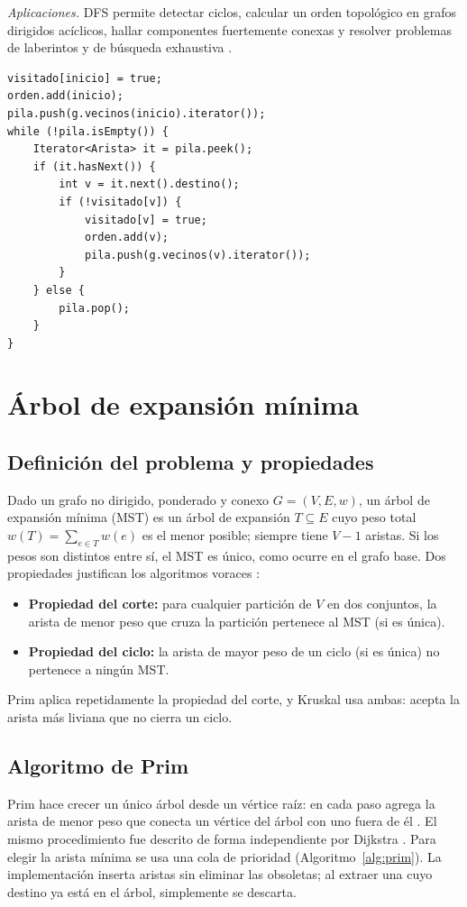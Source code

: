 \documentclass[conference]{IEEEtran}
\begin{document}
\emph{Aplicaciones.} DFS permite detectar ciclos, calcular un orden topológico en grafos dirigidos acíclicos, hallar componentes fuertemente conexas y resolver problemas de laberintos y de búsqueda exhaustiva \cite{clrs,tarjan72}.

\noindent\begin{minipage}{\columnwidth}
\begin{lstlisting}[caption={Núcleo de DFS iterativo (\texttt{DFS.java}).},label={lst:dfs}]
visitado[inicio] = true;
orden.add(inicio);
pila.push(g.vecinos(inicio).iterator());
while (!pila.isEmpty()) {
    Iterator<Arista> it = pila.peek();
    if (it.hasNext()) {
        int v = it.next().destino();
        if (!visitado[v]) {
            visitado[v] = true;
            orden.add(v);
            pila.push(g.vecinos(v).iterator());
        }
    } else {
        pila.pop();
    }
}
\end{lstlisting}
\end{minipage}\par\medskip

\section{Árbol de expansión mínima}
\label{sec:mst}
\subsection{Definición del problema y propiedades}
Dado un grafo no dirigido, ponderado y conexo $G=(V,E,w)$, un árbol de expansión mínima (MST) es un árbol de expansión $T\subseteq E$ cuyo peso total $w(T)=\sum_{e\in T}w(e)$ es el menor posible; siempre tiene $V-1$ aristas. Si los pesos son distintos entre sí, el MST es único, como ocurre en el grafo base. Dos propiedades justifican los algoritmos voraces \cite{clrs}:
\begin{itemize}
  \item \textbf{Propiedad del corte:} para cualquier partición de $V$ en dos conjuntos, la arista de menor peso que cruza la partición pertenece al MST (si es única).
  \item \textbf{Propiedad del ciclo:} la arista de mayor peso de un ciclo (si es única) no pertenece a ningún MST.
\end{itemize}
Prim aplica repetidamente la propiedad del corte, y Kruskal usa ambas: acepta la arista más liviana que no cierra un ciclo.

\subsection{Algoritmo de Prim}
Prim hace crecer un único árbol desde un vértice raíz: en cada paso agrega la arista de menor peso que conecta un vértice del árbol con uno fuera de él \cite{prim}. El mismo procedimiento fue descrito de forma independiente por Dijkstra \cite{dijkstra59}. Para elegir la arista mínima se usa una cola de prioridad (Algoritmo~\ref{alg:prim}). La implementación inserta aristas sin eliminar las obsoletas; al extraer una cuyo destino ya está en el árbol, simplemente se descarta.
\end{document}
